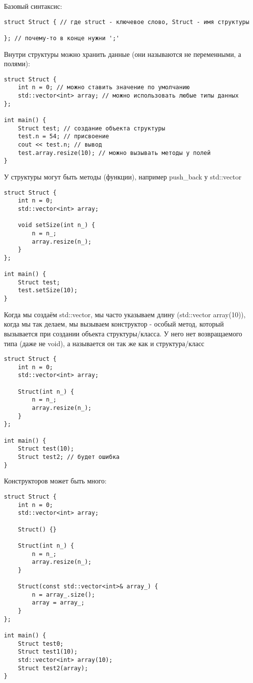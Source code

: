 Базовый синтаксис:

\begin{verbatim}
struct Struct { // где struct - ключевое слово, Struct - имя структуры

}; // почему-то в конце нужни ';'
\end{verbatim}

Внутри структуры можно хранить данные (они называются не переменными, а полями):

\begin{verbatim}
struct Struct {
    int n = 0; // можно ставить значение по умолчанию
    std::vector<int> array; // можно использовать любые типы данных
};

int main() {
    Struct test; // создание объекта структуры
    test.n = 54; // присвоение
    cout << test.n; // вывод
    test.array.resize(10); // можно вызывать методы у полей
}
\end{verbatim}

У структуры могут быть методы (функции), например push\_back у std::vector

\begin{verbatim}
struct Struct {
    int n = 0;
    std::vector<int> array;

    void setSize(int n_) {
        n = n_;
        array.resize(n_);
    }
};

int main() {
    Struct test;
    test.setSize(10);
}
\end{verbatim}

Когда мы создаём std::vector, мы часто указываем длину (std::vector array(10)), когда мы так делаем, мы вызываем
конструктор - особый метод, который вызывается при создании объекта структуры/класса.
У него нет возвращаемого типа (даже не void), а называется он так же как и структура/класс

\begin{verbatim}
struct Struct {
    int n = 0;
    std::vector<int> array;

    Struct(int n_) {
        n = n_;
        array.resize(n_);
    }
};

int main() {
    Struct test(10);
    Struct test2; // будет ошибка
}
\end{verbatim}

Конструкторов может быть много:

\begin{verbatim}
struct Struct {
    int n = 0;
    std::vector<int> array;

    Struct() {}

    Struct(int n_) {
        n = n_;
        array.resize(n_);
    }

    Struct(const std::vector<int>& array_) {
        n = array_.size();
        array = array_;
    }
};

int main() {
    Struct test0;
    Struct test1(10);
    std::vector<int> array(10);
    Struct test2(array);
}
\end{verbatim}

